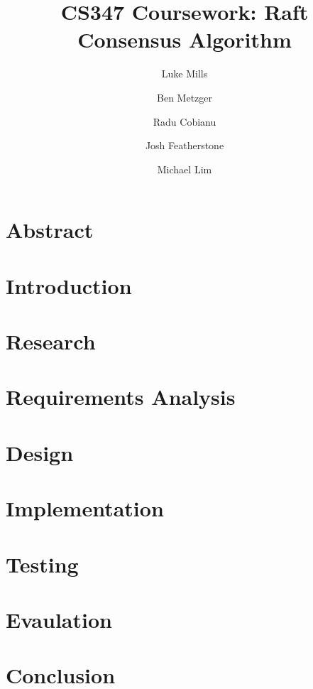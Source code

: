 \documentclass{article}
\title{CS347 Coursework: Raft Consensus Algorithm}
\author{Luke Mills \and Ben Metzger \and Radu Cobianu \and Josh Featherstone \and Michael Lim}
\begin{document}
\maketitle

\section{Abstract}

\section{Introduction}

\section{Research}

\section{Requirements Analysis}

\section{Design}

\section{Implementation}

\section{Testing}

\section{Evaulation}

\section{Conclusion}



\end{document}
